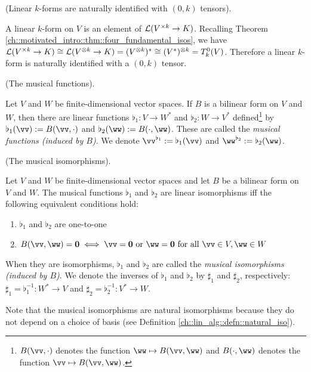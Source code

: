 \begin{remark}
\label{ch::bilinear_forms_metric_tensors::rmk::linear_k_forms_0_k_tensors}

    (Linear $k$-forms are naturally identified with $(0, k)$ tensors).
    
    A linear $k$-form on $V$ is an element of $\mathcal{L}(V^{\times k} \rightarrow K)$. Recalling Theorem \ref{ch::motivated_intro::thm::four_fundamental_isos}, we have $\mathcal{L}(V^{\times k} \rightarrow K) \cong \mathcal{L}(V^{\otimes k} \rightarrow K) = (V^{\otimes k})^* \cong (V^*)^{\otimes k} = T^0_k(V)$. Therefore a linear $k$-form is naturally identified with a $(0, k)$ tensor.
\end{remark}

\begin{defn}
\label{ch::bilinear_forms_metric_tensors::defn::nondegen_bilinear_form}
    (The musical functions).
    
    Let $V$ and $W$ be finite-dimensional vector spaces. If $B$ is a bilinear form on $V$ and $W$, then there are linear functions $\flat_1:V \rightarrow W^{*}$ and $\flat_2:W \rightarrow V^{*}$ defined\footnote{$B(\vv, \cdot)$ denotes the function $\ww \mapsto B(\vv, \ww)$ and $B(\cdot, \ww)$ denotes the function $\vv \mapsto B(\vv, \ww)$.} by $\flat_1(\vv) := B(\vv, \cdot)$ and $\flat_2(\ww) := B(\cdot, \ww)$. These are called the \textit{musical functions (induced by $B$)}. We denote $\vv^{\flat_1} := \flat_1(\vv)$ and $\ww^{\flat_2} := \flat_2(\ww)$.
\end{defn}

\begin{theorem}
    (The musical isomorphisms).

    Let $V$ and $W$ be finite-dimensional vector spaces and let $B$ be a bilinear form on $V$ and $W$. The musical functions $\flat_1$ and $\flat_2$ are linear isomorphisms iff the following equivalent conditions hold:

    \begin{enumerate}
        \item $\flat_1$ and $\flat_2$ are one-to-one
        \item $B(\vv, \ww) = \mathbf{0} \iff \vv = \mathbf{0} \text{ or } \ww = \mathbf{0} \text{ for all } \vv \in V, \ww \in W$
    \end{enumerate}

    When they are isomorphisms, $\flat_1$ and $\flat_2$ are called the \textit{musical isomorphisms (induced by $B$)}. We denote the inverses of $\flat_1$ and $\flat_2$ by $\sharp_1$ and $\sharp_2$, respectively: $\sharp_1 = \flat_1^{-1}:W^* \rightarrow V$ and $\sharp_2 = \flat_2^{-1}:V^* \rightarrow W$.

    Note that the musical isomorphisms are natural isomorphisms because they do not depend on a choice of basis (see Definition \ref{ch::lin_alg::defn::natural_iso}).
\end{theorem}

